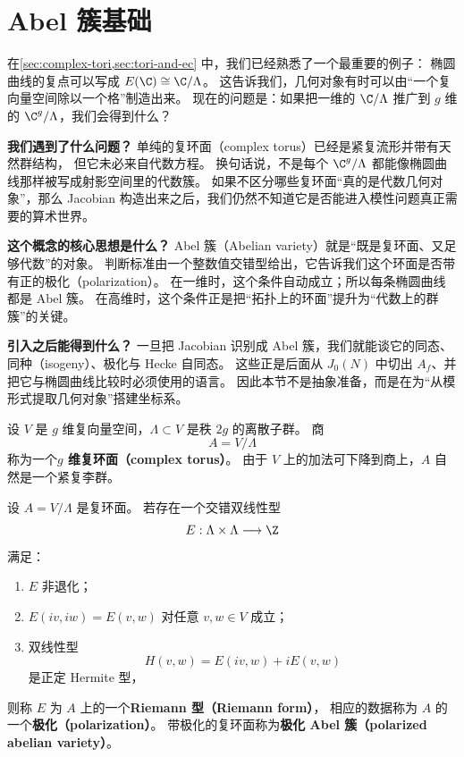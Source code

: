 \section{Abel 簇基础}
\label{sec:abelian-varieties}

在\cref{sec:complex-tori,sec:tori-and-ec} 中，我们已经熟悉了一个最重要的例子：
椭圆曲线的复点可以写成 $E(\C)\cong \C/\Lambda$。
这告诉我们，几何对象有时可以由“一个复向量空间除以一个格”制造出来。
现在的问题是：如果把一维的 $\C/\Lambda$ 推广到 $g$ 维的 $\C^g/\Lambda$，我们会得到什么？

\textbf{我们遇到了什么问题？}
单纯的复环面（complex torus）已经是紧复流形并带有天然群结构，
但它未必来自代数方程。
换句话说，不是每个 $\C^g/\Lambda$ 都能像椭圆曲线那样被写成射影空间里的代数簇。
如果不区分哪些复环面“真的是代数几何对象”，那么 Jacobian 构造出来之后，我们仍然不知道它是否能进入模性问题真正需要的算术世界。

\textbf{这个概念的核心思想是什么？}
Abel 簇（Abelian variety）就是“既是复环面、又足够代数”的对象。
判断标准由一个整数值交错型给出，它告诉我们这个环面是否带有正的极化（polarization）。
在一维时，这个条件自动成立；所以每条椭圆曲线都是 Abel 簇。
在高维时，这个条件正是把“拓扑上的环面”提升为“代数上的群簇”的关键。

\textbf{引入之后能得到什么？}
一旦把 Jacobian 识别成 Abel 簇，我们就能谈它的同态、同种（isogeny）、极化与 Hecke 自同态。
这些正是后面从 $J_0(N)$ 中切出 $A_f$、并把它与椭圆曲线比较时必须使用的语言。
因此本节不是抽象准备，而是在为“从模形式提取几何对象”搭建坐标系。



\begin{definition}[复环面]
\label{def:complex-torus-high-dim}
设 $V$ 是 $g$ 维复向量空间，$\Lambda\subset V$ 是秩 $2g$ 的离散子群。
商
\[
  A=V/\Lambda
\]
称为一个\textbf{$g$ 维复环面（complex torus）}。
由于 $V$ 上的加法可下降到商上，$A$ 自然是一个紧复李群。
\end{definition}

\begin{definition}
\label{def:riemann-form}
设 $A=V/\Lambda$ 是复环面。
若存在一个交错双线性型
\[
  E:\Lambda\times\Lambda\longrightarrow \Z
\]
满足：
\begin{enumerate}
  \item[(i)] $E$ 非退化；
  \item[(ii)] $E(iv,iw)=E(v,w)$ 对任意 $v,w\in V$ 成立；
  \item[(iii)] 双线性型
        \[
          H(v,w)=E(iv,w)+iE(v,w)
        \]
        是正定 Hermite 型，
\end{enumerate}
则称 $E$ 为 $A$ 上的一个\textbf{Riemann 型（Riemann form）}，
相应的数据称为 $A$ 的一个\textbf{极化（polarization）}。
带极化的复环面称为\textbf{极化 Abel 簇（polarized abelian variety）}。
\end{definition}

